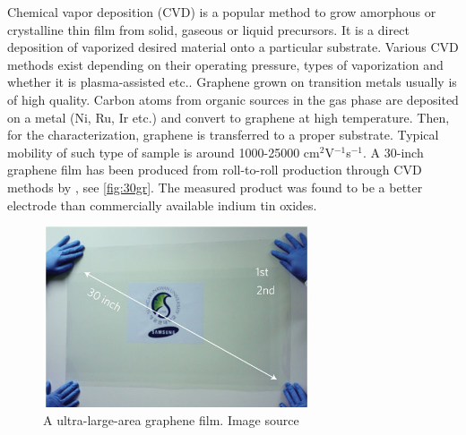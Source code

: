 Chemical vapor deposition (CVD) is a popular method to grow amorphous or crystalline thin film from solid, gaseous or liquid precursors. It is a direct deposition of vaporized desired material onto a particular substrate. Various CVD methods exist depending on their operating pressure, types of vaporization and whether it is plasma-assisted etc.. Graphene grown on transition metals usually is of high quality. Carbon atoms from organic sources in the gas phase are deposited on a metal (Ni, Ru, Ir etc.) and convert to graphene at high temperature. Then, for the characterization, graphene is transferred to a proper substrate. Typical mobility of such type of sample is around 1000-25000 cm$^2$V$^{-1}$s$^{-1}$\cite{Petrone2012}. A 30-inch graphene film has been produced from roll-to-roll production through CVD methods by \citet{Bae2010}, see \autoref{fig:30gr}. The measured product was found to be a better electrode than commercially available indium tin oxides.

\begin{figure}[htbp!] 
\centering  
\includegraphics[width=0.7\textwidth]{30-inches-gr.jpg}
\caption{A ultra-large-area graphene film. Image source \cite{Bae2010}}  
\label{fig:30gr}
\end{figure} 

